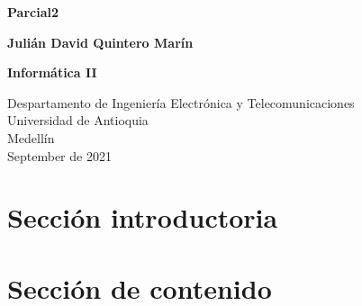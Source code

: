 \documentclass{article}
\begin{document}
\begin{titlepage}
    \begin{center}
        \vspace*{1cm}
            
        \Huge
        \textbf{Parcial2}
            
        \vspace{0.5cm}
        \LARGE
        
            
        \vspace{1.5cm}
            
        \textbf{Julián David Quintero Marín}
        \newline
        \newline
        \newline
        \newline

        
        
        \textbf{Informática II}
        
        \vfill
            
        \vspace{0.8cm}
  
        \Large
        Despartamento de Ingeniería Electrónica y Telecomunicaciones\\
        Universidad de Antioquia\\
        Medellín\\
        September de 2021
            
    \end{center}
\end{titlepage}

\tableofcontents
\newpage
\section{Sección introductoria}\label{intro}


\section{Sección de contenido} \label{contenido}




\end{document}
